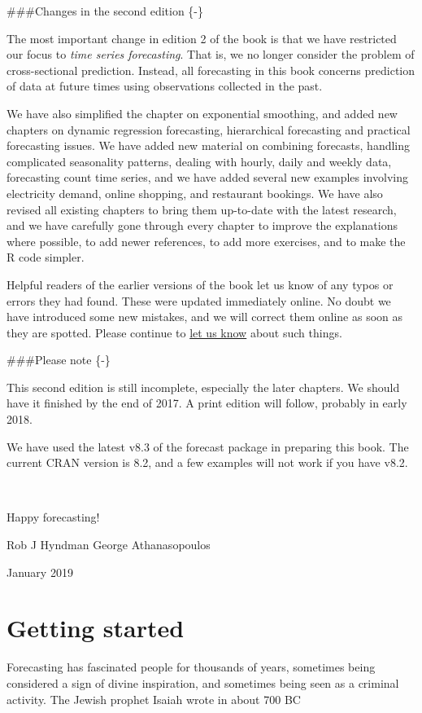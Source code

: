 \documentclass[]{book}
\begin{document}
\#\#\#Changes in the second edition \{-\}

The most important change in edition 2 of the book is that we have restricted our focus to \emph{time series forecasting}. That is, we no longer consider the problem of cross-sectional prediction. Instead, all forecasting in this book concerns prediction of data at future times using observations collected in the past.

We have also simplified the chapter on exponential smoothing, and added new chapters on dynamic regression forecasting, hierarchical forecasting and practical forecasting issues. We have added new material on combining forecasts, handling complicated seasonality patterns, dealing with hourly, daily and weekly data, forecasting count time series, and we have added several new examples involving electricity demand, online shopping, and restaurant bookings. We have also revised all existing chapters to bring them up-to-date with the latest research, and we have carefully gone through every chapter to improve the explanations where possible, to add newer references, to add more exercises, and to make the R code simpler.

Helpful readers of the earlier versions of the book let us know of any typos or errors they had found. These were updated immediately online. No doubt we have introduced some new mistakes, and we will correct them online as soon as they are spotted. Please continue to \href{https://otexts.typeform.com/to/wQom0H}{let us know} about such things.

\#\#\#Please note \{-\}

This second edition is still incomplete, especially the later chapters. We should have it finished by the end of 2017. A print edition will follow, probably in early 2018.

We have used the latest v8.3 of the forecast package in preparing this book. The current CRAN version is 8.2, and a few examples will not work if you have v8.2.

~

Happy forecasting!

Rob J Hyndman
George Athanasopoulos

January 2019

\hypertarget{ch-intro}{%
\chapter{Getting started}\label{ch-intro}}

Forecasting has fascinated people for thousands of years, sometimes being considered a sign of divine inspiration, and sometimes being seen as a criminal activity. The Jewish prophet Isaiah wrote in about 700 BC
\end{document}
